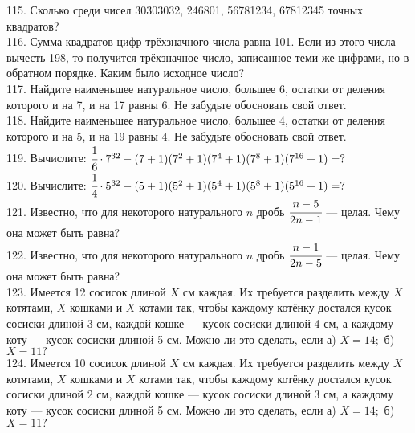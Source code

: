 115. Сколько среди чисел 30303032, 246801, 56781234, 67812345 точных квадратов?\\
116. Сумма квадратов цифр трёхзначного числа равна 101. Если из этого числа вычесть 198, то получится трёхзначное число, записанное теми же цифрами, но в обратном порядке. Каким было исходное число?\\
117. Найдите наименьшее натуральное число, большее 6, остатки от деления которого и на 7, и на 17 равны 6. Не забудьте обосновать свой ответ.\\
118. Найдите наименьшее натуральное число, большее 4, остатки от деления которого и на 5, и на 19 равны 4. Не забудьте обосновать свой ответ.\\
119. Вычислите: $\cfrac{1}{6}\cdot 7^{32}-(7+1)(7^2+1)(7^4+1)(7^8+1)(7^{16}+1)=?$\\
120. Вычислите: $\cfrac{1}{4}\cdot 5^{32}-(5+1)(5^2+1)(5^4+1)(5^8+1)(5^{16}+1)=?$\\
121. Известно, что для некоторого натурального $n$ дробь $\cfrac{n - 5}{2n - 1}$ --- целая. Чему она может быть
равна?\\
122. Известно, что для некоторого натурального $n$ дробь $\cfrac{n - 1}{2n - 5}$ --- целая. Чему она может быть
равна?\\
123. Имеется 12 сосисок длиной $X$ см каждая. Их требуется разделить между $X$ котятами, $X$ кошками и $X$ котами так, чтобы каждому котёнку достался кусок сосиски длиной 3 см, каждой кошке ---
кусок сосиски длиной 4 см, а каждому коту --- кусок сосиски длиной 5 см. Можно ли это сделать, если а) $X = 14;$ б) $X = 11?$\\
124. Имеется 10 сосисок длиной $X$ см каждая. Их требуется разделить между $X$ котятами, $X$ кошками и $X$ котами так, чтобы каждому котёнку достался кусок сосиски длиной 2 см, каждой кошке ---
кусок сосиски длиной 3 см, а каждому коту --- кусок сосиски длиной 5 см. Можно ли это сделать, если а) $X = 14;$ б) $X = 11?$
\newpage
